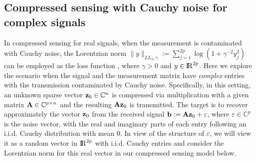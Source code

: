 \documentclass[10pt]{article}
\numberwithin{equation}{section}
\def\R{{\rm I\!R}}
\begin{document}
\subsection{Compressed sensing with Cauchy noise for complex signals}\label{sec6.2}
{\color{blue} In compressed sensing for real signals, when the measurement is contaminated with Cauchy noise, the Lorentzian norm $\|y\|_{LL_2,\gamma}:= \sum\limits_{j=1}^{2p}\log(1 + \gamma^{-2}y_j^2)$ can be employed as the loss function \cite{CaBA10,CaRA16}, where $\gamma > 0$ and $y\in \R^{2p}$. Here we explore the scenario when the signal and the measurement matrix have \emph{complex} entries with the transmission contaminated by Cauchy noise. Specifically, in this setting, an unknown sparse vector ${\bf z}_0\in {\mathbb{C}}^n$ is compressed via multiplication with a given matrix ${\bf A}\in \mathbb{C}^{p\times n}$ and the resulting ${\bf A} {\bf z}_0$ is transmitted. The target is to recover approximately the vector ${\bf z}_0$ from the received signal ${\bf b} := {\bf A}{\bf z}_0 + \varepsilon$, where $\varepsilon \in {\mathbb{C}}^p$ is the noise vector, with the real and imaginary parts of each entry following an i.i.d. Cauchy distribution with mean $0$. In view of the structure of $\varepsilon$, we will view it as a random vector in $\R^{2p}$ with i.i.d. Cauchy entries and consider the Lorentzian norm for this real vector in our compressed sensing model below.

}
\end{document}
